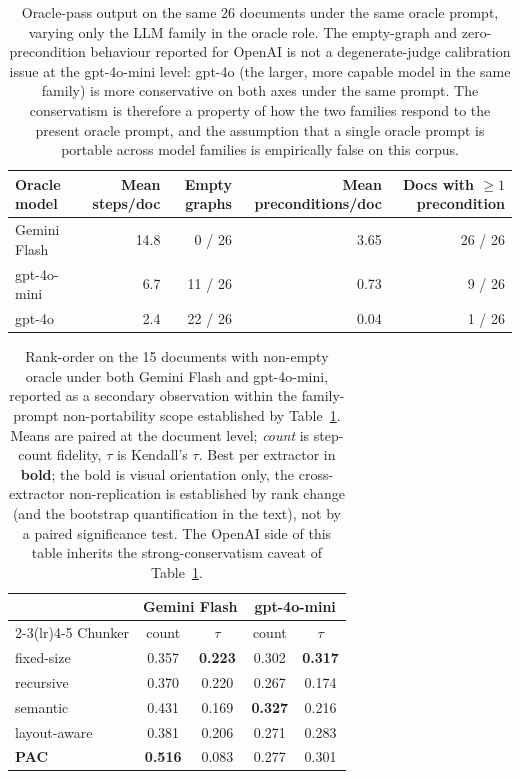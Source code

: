 \documentclass[make,article,submit,oneauthor,pdftex]{Definitions/mdpi}
\begin{document}
\begin{table}[ht]
\centering
\caption{Oracle-pass output on the same 26 documents under the same
oracle prompt, varying only the LLM family in the oracle role. The
empty-graph and zero-precondition behaviour reported for OpenAI is
not a degenerate-judge calibration issue at the gpt-4o-mini level:
gpt-4o (the larger, more capable model in the same family) is more
conservative on both axes under the same prompt. The conservatism is
therefore a property of how the two families respond to the present
oracle prompt, and the assumption that a single oracle prompt is
portable across model families is empirically false on this corpus.}
\label{tab:oracle-by-family}
\begin{tabular}{lrrrr}
\toprule
Oracle model & Mean steps/doc & Empty graphs & Mean preconditions/doc & Docs with $\geq 1$ precondition \\
\midrule
Gemini Flash  & 14.8 & 0 / 26  & 3.65 & 26 / 26 \\
gpt-4o-mini   & 6.7  & 11 / 26 & 0.73 & 9 / 26 \\
gpt-4o        & 2.4  & 22 / 26 & 0.04 & 1 / 26 \\
\bottomrule
\end{tabular}
\end{table}

\begin{table}[ht]
\centering
\caption{Rank-order on the 15 documents with non-empty oracle under
both Gemini Flash and gpt-4o-mini, reported as a secondary observation
within the family-prompt non-portability scope established by
Table~\ref{tab:oracle-by-family}. Means are paired at the document
level; \emph{count} is step-count fidelity, $\tau$ is Kendall's
$\tau$. Best per extractor in \textbf{bold}; the bold is visual
orientation only, the cross-extractor non-replication is established
by rank change (and the bootstrap quantification in the text), not
by a paired significance test. The OpenAI side of this table inherits
the strong-conservatism caveat of Table~\ref{tab:oracle-by-family}.}
\label{tab:robust}
\begin{tabular}{lcccc}
\toprule
& \multicolumn{2}{c}{Gemini Flash}
& \multicolumn{2}{c}{gpt-4o-mini} \\
\cmidrule(lr){2-3}\cmidrule(lr){4-5}
Chunker & count & $\tau$ & count & $\tau$ \\
\midrule
fixed-size   & 0.357 & \textbf{0.223} & 0.302 & \textbf{0.317} \\
recursive    & 0.370 & 0.220 & 0.267 & 0.174 \\
semantic     & 0.431 & 0.169 & \textbf{0.327} & 0.216 \\
layout-aware & 0.381 & 0.206 & 0.271 & 0.283 \\
\textbf{PAC} & \textbf{0.516} & 0.083 & 0.277 & 0.301 \\
\bottomrule
\end{tabular}
\end{table}
\end{document}
